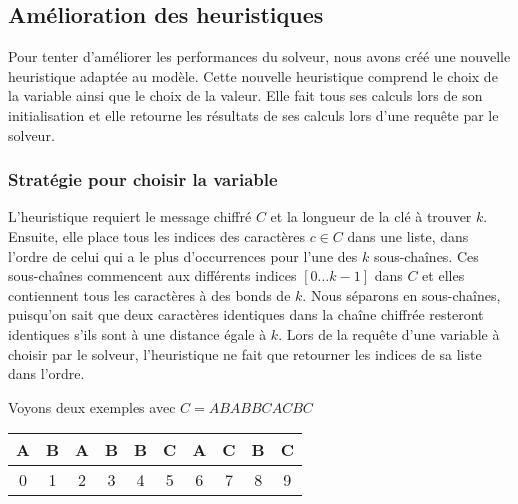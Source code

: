 \documentclass[11pt]{article}
\begin{document}
		\subsection{Amélioration des heuristiques}
			Pour tenter d'améliorer les performances du solveur, nous avons créé une nouvelle heuristique adaptée au modèle.
			Cette nouvelle heuristique comprend le choix de la variable ainsi que le choix de la valeur.
			Elle fait tous ses calculs lors de son initialisation et elle retourne les résultats de ses calculs lors d'une requête par le solveur.

			\subsubsection{Stratégie pour choisir la variable}
				L'heuristique requiert le message chiffré $C$ et la longueur de la clé à trouver $k$.
				Ensuite, elle place tous les indices des caractères $c \in C$ dans une liste, dans l'ordre de celui qui a le plus d'occurrences pour l'une des $k$ sous-chaînes.
				Ces sous-chaînes commencent aux différents indices $[0...k-1]$ dans $C$ et elles contiennent tous les caractères à des bonds de $k$.
				Nous séparons en sous-chaînes, puisqu'on sait que deux caractères identiques dans la chaîne chiffrée resteront identiques s'ils sont à une distance égale à $k$.
				Lors de la requête d'une variable à choisir par le solveur, l'heuristique ne fait que retourner les indices de sa liste dans l'ordre.

				\bigskip

				Voyons deux exemples avec $C = ABABBCACBC$
				\begin{center}
					\begin{tabular}{| c | c | c | c | c | c | c | c | c | c |}
						\hline
						\textbf{A} & \textbf{B} & \textbf{A} & \textbf{B} & \textbf{B} & \textbf{C} & \textbf{A} & \textbf{C} & \textbf{B} & \textbf{C} \\
						\hline
						0 & 1 & 2 & 3 & 4 & 5 & 6 & 7 & 8 & 9 \\
						\hline
					\end{tabular}
				\end{center}
\end{document}

